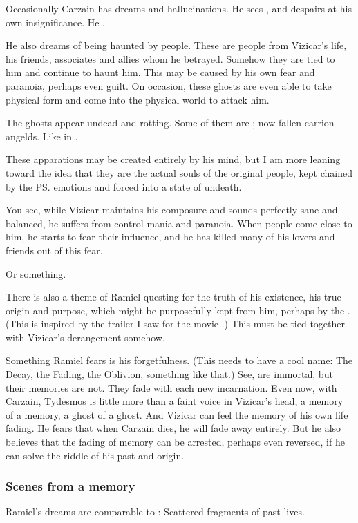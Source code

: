 Occasionally Carzain has dreams and hallucinations. 
He sees , and despairs at his own insignificance. 
He .

He also dreams of being haunted by people. 
These are people from Vizicar's life, his friends, associates and allies whom he betrayed. Somehow they are tied to him and continue to haunt him. This may be caused by his own fear and paranoia, perhaps even guilt.
On occasion, these ghosts are even able to take physical form and come into the physical world to attack him. 

The ghosts appear undead and rotting. 
Some of them are \resphain; now fallen carrion angelds. 
Like in . 

These apparations may be created entirely by his mind, but I am more leaning toward the idea that they are the actual souls of the original people, kept chained by the \ps{\Malach}{} emotions and forced into a state of undeath. 

You see, while Vizicar maintains his composure and sounds perfectly sane and balanced, he suffers from control-mania and paranoia. When people come close to him, he starts to fear their influence, and he has killed many of his lovers and friends out of this fear. 

Or something. 

There is also a theme of Ramiel questing for the truth of his existence, his true origin and purpose, which might be purposefully kept from him, perhaps by the \banes. 
(This is inspired by the trailer I saw for the movie \cite{Movie:BourneUltimatum}.) 
This must be tied together with Vizicar's derangement somehow. 

Something Ramiel fears is his forgetfulness. (This needs to have a cool name: The Decay, the Fading, the Oblivion, something like that.) 
See, \Malachim{} are immortal, but their memories are not. 
They fade with each new incarnation. Even now, with Carzain, Tydesmos is little more than a faint voice in Vizicar's head, a memory of a memory, a ghost of a ghost. And Vizicar can feel the memory of his own life fading. He fears that when Carzain dies, he will fade away entirely. But he also believes that the fading of memory can be arrested, perhaps even reversed, if he can solve the riddle of his past and origin. 





\subsubsection{Scenes from a memory}
Ramiel's dreams are comparable to \cite{DreamTheater:ScenesfromaMemory}: Scattered fragments of past lives. 

